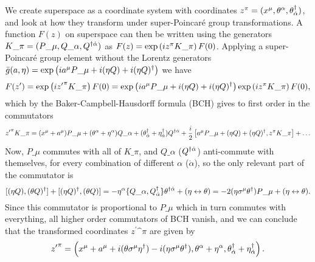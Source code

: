 \documentclass[../main.tex]{subfiles}
\begin{document}
We create superspace as a coordinate system with coordinates \(z\^{\pi} = (x\^{\mu}, \theta\^{\alpha}, \theta\indices*{^\dagger_{\dot\alpha}})\), and look at how they transform under super-Poincaré group transformations.
A function \(F(z)\) on superspace can then be written using the generators \(K\_\pi = (P\_\mu, Q\_\alpha, Q\indices*{^\dagger^{\dot\alpha}})\) as \(F(z) = \exptext{iz\^\pi K\_\pi} F(0)\).
Applying a super-Poincaré group element without the Lorentz generators \(\bar{g}(a, \eta) = \exptext{ia\^\mu P\_\mu + i (\eta Q) + i (\eta Q)^\dagger}\) we have
\begin{equation}
  F(z^\prime) = \exptext{i{z^\prime}\^\pi K\_\pi} F(0) = \exptext{ia\^\mu P\_\mu + i (\eta Q) + i (\eta Q)^\dagger} \exptext{iz\^\pi K\_\pi} F(0),
\end{equation}
which by the Baker-Campbell-Hausdorff formula (BCH) gives to first order in the commutators
\begin{equation}
  \label{susy:eq:supersymmetry_transformation}
  {z^\prime}\^\pi K\_\pi = (x\^\mu + a\^\mu) P\_\mu + (\theta\^\alpha + \eta\^\alpha)Q\_\alpha + (\theta\indices*{^\dagger_{\dot\alpha}} + \eta\indices*{^\dagger_{\dot\alpha}})Q\indices*{^\dagger^{\dot\alpha}} + \frac{i}{2}\bclosed{a\^\mu P\_\mu + (\eta Q) + (\eta Q)^\dagger, z\^\pi K\_\pi} + \ldots
\end{equation}
Now, \(P\_\mu\) commutes with all of \(K\_\pi\), and \(Q\_\alpha\) (\(Q\indices*{^\dagger^{\dot\alpha}}\)) anti-commute with themselves, for every combination of different \(\alpha\) (\(\dot\alpha\)), so the only relevant part of the commutator is
\begin{equation}
  \commutator{(\eta Q)}{(\theta Q)^\dagger} + \commutator{(\eta Q)^\dagger}{(\theta Q)} = -\eta\^\alpha \anticommutator{Q\_\alpha}{Q\indices*{^\dagger_{\dot\alpha}}} \theta\indices*{^\dagger^{\dot\alpha}} + (\eta \leftrightarrow \theta) = -2(\eta \sigma\^\mu \theta^\dagger)P\_\mu + (\eta \leftrightarrow \theta).
\end{equation}
Since this commutator is proportional to \(P\_\mu\) which in turn commutes with everything, all higher order commutators of BCH vanish, and we can conclude that the transformed coordinates \({z^\prime}\^\pi\) are given by
\begin{equation}
  \label{susy:eq:zprime}
  {z^\prime}\^\pi = \pclosed{x\^\mu + a\^\mu + i(\theta \sigma\^\mu \eta^\dagger) - i(\eta \sigma\^\mu \theta^\dagger), \theta\^\alpha + \eta\^\alpha, \theta\indices*{^\dagger_{\dot\alpha}} + \eta\indices*{^\dagger_{\dot\alpha}}}.
\end{equation}
\end{document}
